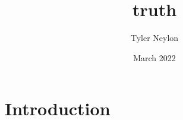 \documentclass{article}
\title{truth}
\author{Tyler Neylon}
\date{March 2022}
\begin{document}
\maketitle

\section{Introduction}
\end{document}
